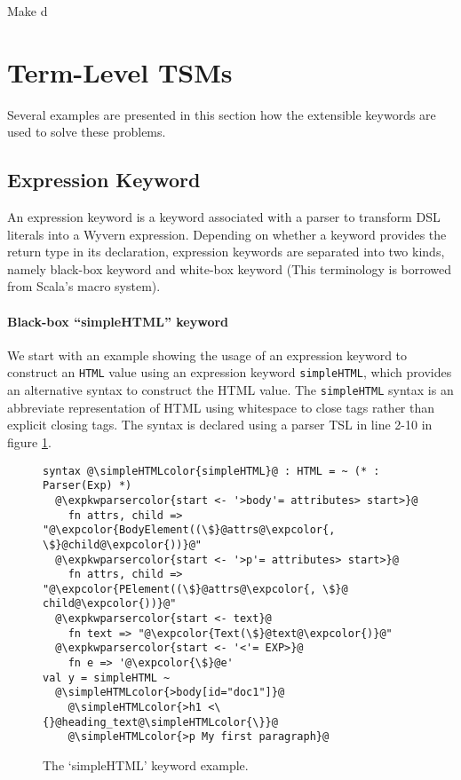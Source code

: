 \documentclass{sig-alternate}
\newcommand{\expkwparsercolor}[1]{\textcolor[HTML]{336699}{#1}}
\newcommand{\expcolor}[1]{\textcolor[HTML]{FF0033}{#1}}
\newcommand{\simpleHTMLcolor}[1]{\textcolor[HTML]{7D5100}{#1}}
\newcommand{\mycaption}[1]{\vspace{-4px}\caption{#1}\vspace{-2px}}
\begin{document}
Make d
\section{Term-Level TSM\lowercase{s}}\label{tsms-term}
Several examples are presented in this section how the extensible keywords are used to solve these problems.
\subsection{Expression Keyword}
An expression keyword is a keyword associated with a parser to transform DSL literals into a Wyvern expression. Depending on whether a keyword provides the return type in its declaration, expression keywords are separated into two kinds, namely black-box keyword and white-box keyword (This terminology is borrowed from Scala's macro system). 

\paragraph{Black-box ``simpleHTML'' keyword}
We start with an example showing the usage of an expression keyword to construct an \verb|HTML| value using an expression keyword \verb|simpleHTML|, which provides an alternative syntax to construct the HTML value. The \verb|simpleHTML| syntax is an abbreviate representation of HTML using whitespace to close tags rather than explicit closing tags. The syntax is declared using a parser TSL in line 2-10 in figure \ref{f-simplehtml}.
\begin{figure}[t]
\begin{lstlisting}[style=wyvern]
syntax @\simpleHTMLcolor{simpleHTML}@ : HTML = ~ (* : Parser(Exp) *)
  @\expkwparsercolor{start <- '>body'= attributes> start>}@
    fn attrs, child => "@\expcolor{BodyElement((\$}@attrs@\expcolor{, \$}@child@\expcolor{))}@"
  @\expkwparsercolor{start <- '>p'= attributes> start>}@
    fn attrs, child => "@\expcolor{PElement((\$}@attrs@\expcolor{, \$}@ child@\expcolor{))}@"
  @\expkwparsercolor{start <- text}@
    fn text => "@\expcolor{Text(\$}@text@\expcolor{)}@"
  @\expkwparsercolor{start <- '<'= EXP>}@
    fn e => '@\expcolor{\$}@e'
val y = simpleHTML ~
  @\simpleHTMLcolor{>body[id="doc1"]}@
    @\simpleHTMLcolor{>h1 <\{}@heading_text@\simpleHTMLcolor{\}}@
    @\simpleHTMLcolor{>p My first paragraph}@
\end{lstlisting}
\mycaption{The `simpleHTML' keyword example.}
\label{f-simplehtml}
\end{figure}
\end{document}
